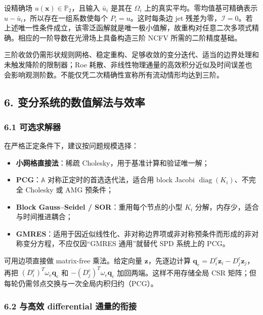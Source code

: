 \documentclass[
  12pt,
  UTF8]{ctexart}
\providecommand{\tightlist}{%
  \setlength{\itemsep}{0pt}\setlength{\parskip}{0pt}}
\begin{document}
设精确场 \(u(\boldsymbol x)\in\mathbb P_2\)，且输入 \(\bar u_i\) 是其在
\(\Omega_i\) 上的真实平均。零均值基可精确表示
\(u-\bar u_i\)，所以存在一组系数使每个 \(P_i=u\)。这时每条边 jet
残差为零，\(\mathcal I=0\)。若上述唯一性条件成立，该零泛函解就是唯一极小值解，故重构对任意二次多项式精确。相应的一阶导数在光滑场上具备构造三阶
NCFV 所需的二阶精度基础。

三阶收敛仍需形状规则网格、稳定重构、足够收敛的变分迭代、适当的边界处理和未触发降阶的限制器；Roe
耗散、非线性物理通量的高效积分近似及时间误差也会影响观测阶数。不能仅凭二次精确性宣称所有流动情形均达到三阶。

\hypertarget{ux53d8ux5206ux7cfbux7edfux7684ux6570ux503cux89e3ux6cd5ux4e0eux6548ux7387}{%
\subsection{6.
变分系统的数值解法与效率}\label{ux53d8ux5206ux7cfbux7edfux7684ux6570ux503cux89e3ux6cd5ux4e0eux6548ux7387}}

\hypertarget{ux53efux9009ux6c42ux89e3ux5668}{%
\subsubsection{6.1 可选求解器}\label{ux53efux9009ux6c42ux89e3ux5668}}

在严格正定条件下，建议按问题规模选择：

\begin{itemize}
\tightlist
\item
  \textbf{小网格直接法}：稀疏 Cholesky，用于基准计算和验证唯一解；
\item
  \textbf{PCG}：\(\mathbb A\) 对称正定时的首选迭代法，适合用 block
  Jacobi \(\operatorname{diag}(K_i)\)、不完全 Cholesky 或 AMG 预条件；
\item
  \textbf{Block Gauss--Seidel / SOR}：重用每个节点的小型 \(K_i\)
  分解，内存少，适合与时间推进耦合；
\item
  \textbf{GMRES}：适用于因近似线性化、非对称边界项或非对称预条件而形成的非对称变分方程，不应仅因``GMRES
  通用''就替代 SPD 系统上的 PCG。
\end{itemize}

可用边项直接做 matrix-free 乘法。给定向量 \(\boldsymbol z\)，先逐边计算
\(\boldsymbol q_e=D_i^e\boldsymbol z_i-D_j^e\boldsymbol z_j\)，再把
\((D_i^e)^T\omega_e\boldsymbol q_e\) 和
\(-(D_j^e)^T\omega_e\boldsymbol q_e\) 加回两端。这样不用存储全局 CSR
矩阵；但每轮仍需邻点交换与一次全局内积归约（PCG）。

\hypertarget{ux4e0eux9ad8ux6548-differential-ux901aux91cfux7684ux8854ux63a5}{%
\subsubsection{6.2 与高效 differential
通量的衔接}\label{ux4e0eux9ad8ux6548-differential-ux901aux91cfux7684ux8854ux63a5}}
\end{document}
